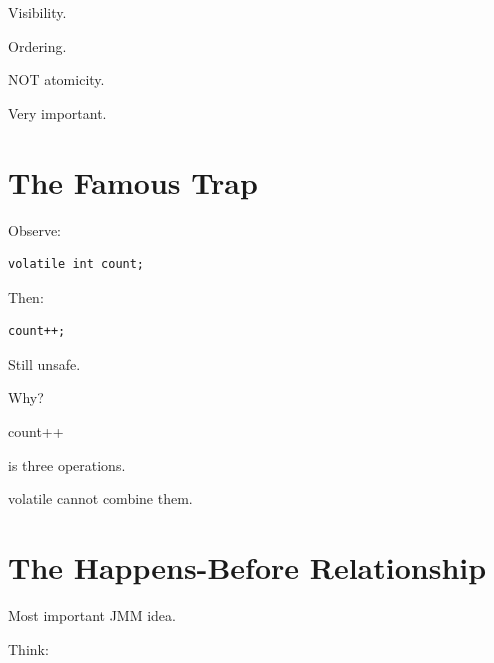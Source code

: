 \documentclass[11pt,a4paper]{book}
\begin{document}
Visibility.


Ordering.


NOT atomicity.


Very important.


\section{The Famous Trap}

Observe:

\begin{verbatim} 
volatile int count;
\end{verbatim}

Then:

\begin{verbatim} 
count++;
\end{verbatim}


Still unsafe.


Why?


count++

is three operations.


volatile cannot combine them.


\section{The Happens-Before Relationship}

Most important JMM idea.


Think:

\end{document}
